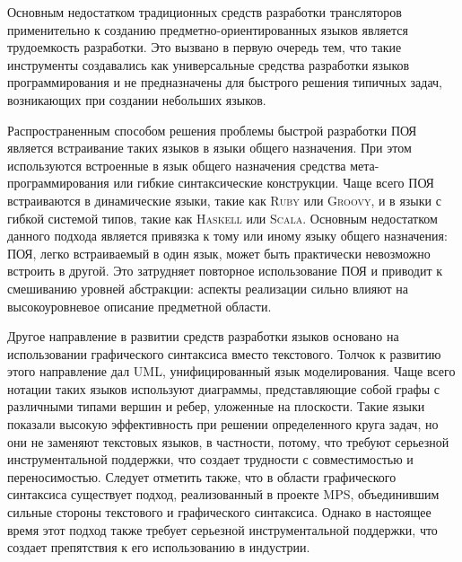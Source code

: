 \documentclass[12pt,a4paper]{article}
\newcommand{\tool}[1]{\textsc{#1}}
\theoremstyle{definition}
\theoremstyle{plain}
\begin{document}
Основным недостатком традиционных средств разработки трансляторов применительно к созданию предметно-ориентированных языков является трудоемкость разработки. Это вызвано в первую очередь тем, что такие инструменты создавались как универсальные средства разработки языков программирования и не предназначены для быстрого решения типичных задач, возникающих при создании небольших языков.

Распространенным способом решения проблемы быстрой разработки ПОЯ является встраивание таких языков в языки общего назначения. При этом используются встроенные в язык общего назначения средства мета-программирования или гибкие синтаксические конструкции. Чаще всего ПОЯ встраиваются в динамические языки, такие как \tool{Ruby} или \tool{Groovy}, и в языки с гибкой системой типов, такие как \tool{Haskell} или \tool{Scala}. Основным недостатком данного подхода является привязка к тому или иному языку общего назначения: ПОЯ, легко встраиваемый в один язык, может быть практически невозможно встроить в другой. Это затрудняет повторное использование ПОЯ и приводит к смешиванию уровней абстракции: аспекты реализации сильно влияют на высокоуровневое описание предметной области.

Другое направление в развитии средств разработки языков основано на использовании графического синтаксиса вместо текстового. Толчок к развитию этого направление дал UML, унифицированный язык моделирования. Чаще всего нотации таких языков используют диаграммы, представляющие собой графы с различными типами вершин и ребер, уложенные на плоскости. Такие языки показали высокую эффективность при решении определенного круга задач, но они не заменяют текстовых языков, в частности, потому, что требуют серьезной инструментальной поддержки, что создает трудности с совместимостью и переносимостью. Следует отметить также, что в области графического синтаксиса существует подход, реализованный в проекте \tool{MPS}, объединившим сильные стороны текстового и графического синтаксиса. Однако в настоящее время этот подход также требует серьезной инструментальной поддержки, что создает препятствия к его использованию в индустрии.
\end{document}
